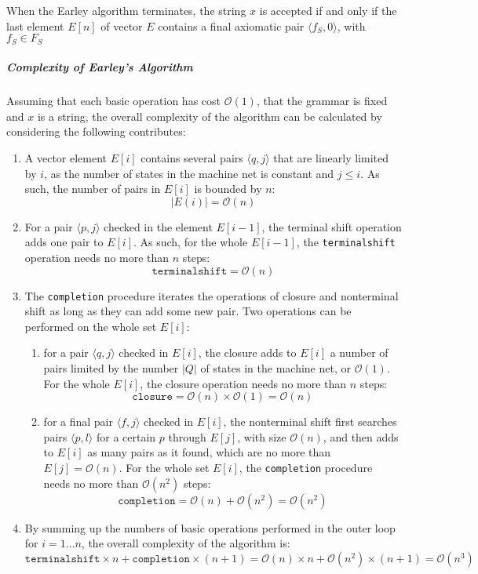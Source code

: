 \begin{property}
  When the Earley algorithm terminates, the string \(x\) is accepted if and only if the last element \(E[n]\) of vector \(E\) contains a final axiomatic pair \(\langle f_S, 0 \rangle\), with \(f_S \in F_S\)
\end{property}

\subparagraph*{Complexity of Earley's Algorithm}
Assuming that each basic operation has cost \(\mathcal{O}(1)\), that the grammar is fixed and \(x\) is a string, the overall complexity of the algorithm can be calculated by considering the following contributes:

\begin{enumerate}
  \item A vector element \(E[i]\) contains several pairs \(\langle q, j \rangle\) that are linearly limited by \(i\), as the number of states in the machine net is constant and \(j \leq i\). As such, the number of pairs in \(E[i]\) is bounded by \(n\): \[ |E(i)| = \mathcal{O}(n) \]
  \item For a pair \(\langle p, j \rangle\) checked in the element \(E[i-1]\), the terminal shift operation adds one pair to \(E[i]\). As such, for the whole \(E[i-1]\), the \texttt{terminalshift} operation needs no more than \(n\) steps: \[ \texttt{terminalshift} = \mathcal{O}(n) \]
  \item The \texttt{completion} procedure iterates the operations of closure and nonterminal shift as long as they can add some new pair. Two operations can be performed on the whole set \(E[i]\):
        \begin{enumerate}
          \item for a pair \(\langle q, j\rangle\) checked in \(E[i]\), the closure adds to \(E[i]\) a number of pairs limited by the number \(|Q|\) of states in the machine net, or \(\mathcal{O}(1)\). For the whole \(E[i]\), the closure operation needs no more than \(n\) steps: \[ \texttt{closure} = \mathcal{O}(n) \times \mathcal{O}(1) = \mathcal{O}(n) \]
          \item for a final pair \(\langle f, j \rangle\) checked in \(E[i]\), the nonterminal shift first searches pairs \(\langle p, l\rangle\) for a certain \(p\) through \(E[j]\), with size \(\mathcal{O}(n)\), and then adds to \(E[i]\) as many pairs as it found, which are no more than \(E[j] = \mathcal{O}(n)\). For the whole set \(E[i]\), the \texttt{completion} procedure needs no more than \(\mathcal{O}(n^2)\) steps: \[ \texttt{completion} = \mathcal{O}(n) + \mathcal{O}(n^2) = \mathcal{O}(n^2) \]
        \end{enumerate}
  \item By summing up the numbers of basic operations performed in the outer loop for \(i = 1 \dots n\), the overall complexity of the algorithm is: \[ \texttt{terminalshift} \times n + \texttt{completion} \times (n+1) = \mathcal{O}(n) \times n + \mathcal{O}(n^2) \times (n + 1) = \mathcal{O}(n^3) \]
\end{enumerate}

